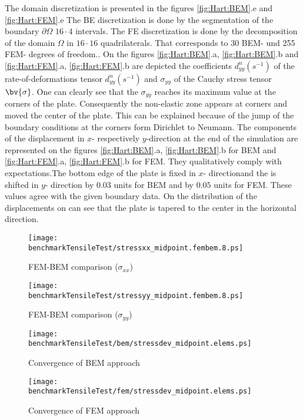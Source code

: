 The domain discretization is presented in the figures \ref{fig:Hart:BEM}.e and \ref{fig:Hart:FEM}.e  The BE discretization is done by the segmentation of the boundary $\partial \Omega$
$16 \cdot 4$ intervals. The FE discretization is done by the decomposition of the domain $\Omega$ in
$16 \cdot 16$ quadrilaterals. That corresponds to  30 BEM- und 255 FEM- degrees of freedom..
On the figures \ref{fig:Hart:BEM}.a, \ref{fig:Hart:BEM}.b and \ref{fig:Hart:FEM}.a, \ref{fig:Hart:FEM}.b are depicted the coefficients  $d^n_{yy}(s^{-1})$ of the  rate-of-deformations tensor $d^n_{yy}(s^{-1})$ and $\sigma_{yy}$ of the Cauchy stress tensor $\bv{\sigma}$. One can clearly see that the $\sigma_{yy}$ reaches its maximum value at the corners of the plate. Consequently the non-elastic zone appears at corners and moved the center of the plate. This can be explained because of the jump of the boundary conditions at the corners form Dirichlet to Neumann.
The components of the displacement  in $x$- respectively $y$-direction at the end of the simulation are represented on the figures \ref{fig:Hart:BEM}.a, \ref{fig:Hart:BEM}.b for BEM
and \ref{fig:Hart:FEM}.a, \ref{fig:Hart:FEM}.b for FEM. They qualitatively  comply with expectations.The bottom edge of the plate is fixed in  $x$- directionand the  is shifted in $y$- direction by $0.03$ units  for BEM and by $0.05$ units for FEM. These values agree with the  given boundary data. On the distribution of the displacements on can see that the plate is tapered to the  center in the horizontal direction.

\begin{figure}[h!]
\begin{minipage}[c]{8cm} 
\texttt{[image: \\benchmarkTensileTest/stressxx\_midpoint.fembem.8.ps]}

\caption{FEM-BEM comparison ($\sigma_{xx}$)}
\end{minipage}
\begin{minipage}[l]{8cm}
\texttt{[image: \\benchmarkTensileTest/stressyy\_midpoint.fembem.8.ps]}

\caption{FEM-BEM comparison ($\sigma_{yy}$)}
\end{minipage}

\begin{minipage}[c]{8cm} 
\texttt{[image: \\benchmarkTensileTest/bem/stressdev\_midpoint.elems.ps]}

\caption{Convergence of BEM approach}
\end{minipage}
\begin{minipage}[l]{8cm}
\texttt{[image: \\benchmarkTensileTest/fem/stressdev\_midpoint.elems.ps]}

\caption{Convergence of FEM approach}
\end{minipage}
\end{figure}

